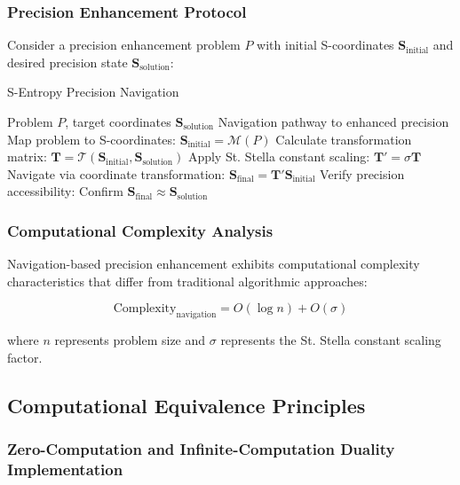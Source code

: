 \documentclass[12pt,a4paper]{article}
\begin{document}
{\subsubsection{Precision Enhancement Protocol}

Consider a precision enhancement problem $P$ with initial S-coordinates $\mathbf{S}_{\text{initial}}$ and desired precision state $\mathbf{S}_{\text{solution}}$:

\begin{algorithm}[H]
\caption{S-Entropy Precision Navigation}
\begin{algorithmic}[1]
\REQUIRE Problem $P$, target coordinates $\mathbf{S}_{\text{solution}}$
\ENSURE Navigation pathway to enhanced precision
\STATE Map problem to S-coordinates: $\mathbf{S}_{\text{initial}} = \mathcal{M}(P)$
\STATE Calculate transformation matrix: $\mathbf{T} = \mathcal{T}(\mathbf{S}_{\text{initial}}, \mathbf{S}_{\text{solution}})$
\STATE Apply St. Stella constant scaling: $\mathbf{T}' = \sigma \mathbf{T}$
\STATE Navigate via coordinate transformation: $\mathbf{S}_{\text{final}} = \mathbf{T}' \mathbf{S}_{\text{initial}}$
\STATE Verify precision accessibility: Confirm $\mathbf{S}_{\text{final}} \approx \mathbf{S}_{\text{solution}}$
\end{algorithmic}
\end{algorithm}

\subsubsection{Computational Complexity Analysis}

Navigation-based precision enhancement exhibits computational complexity characteristics that differ from traditional algorithmic approaches:

\begin{equation}
\text{Complexity}_{\text{navigation}} = O(\log n) + O(\sigma)
\label{eq:navigation_complexity}
\end{equation}

where $n$ represents problem size and $\sigma$ represents the St. Stella constant scaling factor.

\subsection{Computational Equivalence Principles}

\subsubsection{Zero-Computation and Infinite-Computation Duality Implementation}

}
\end{document}
